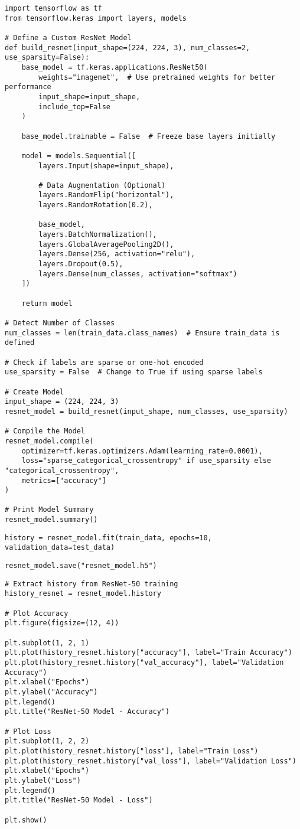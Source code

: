 \documentclass{article}
\begin{document}
\begin{lstlisting}
import tensorflow as tf
from tensorflow.keras import layers, models

# Define a Custom ResNet Model
def build_resnet(input_shape=(224, 224, 3), num_classes=2, use_sparsity=False):
    base_model = tf.keras.applications.ResNet50(
        weights="imagenet",  # Use pretrained weights for better performance
        input_shape=input_shape,
        include_top=False
    )

    base_model.trainable = False  # Freeze base layers initially

    model = models.Sequential([
        layers.Input(shape=input_shape),

        # Data Augmentation (Optional)
        layers.RandomFlip("horizontal"),
        layers.RandomRotation(0.2),

        base_model,
        layers.BatchNormalization(),
        layers.GlobalAveragePooling2D(),
        layers.Dense(256, activation="relu"),
        layers.Dropout(0.5),
        layers.Dense(num_classes, activation="softmax")
    ])

    return model

# Detect Number of Classes
num_classes = len(train_data.class_names)  # Ensure train_data is defined

# Check if labels are sparse or one-hot encoded
use_sparsity = False  # Change to True if using sparse labels

# Create Model
input_shape = (224, 224, 3)
resnet_model = build_resnet(input_shape, num_classes, use_sparsity)

# Compile the Model
resnet_model.compile(
    optimizer=tf.keras.optimizers.Adam(learning_rate=0.0001),
    loss="sparse_categorical_crossentropy" if use_sparsity else "categorical_crossentropy",
    metrics=["accuracy"]
)

# Print Model Summary
resnet_model.summary()

\end{lstlisting}
\begin{lstlisting}
history = resnet_model.fit(train_data, epochs=10, validation_data=test_data)
\end{lstlisting}
\begin{lstlisting}
resnet_model.save("resnet_model.h5")
\end{lstlisting}
\begin{lstlisting}
# Extract history from ResNet-50 training
history_resnet = resnet_model.history

# Plot Accuracy
plt.figure(figsize=(12, 4))

plt.subplot(1, 2, 1)
plt.plot(history_resnet.history["accuracy"], label="Train Accuracy")
plt.plot(history_resnet.history["val_accuracy"], label="Validation Accuracy")
plt.xlabel("Epochs")
plt.ylabel("Accuracy")
plt.legend()
plt.title("ResNet-50 Model - Accuracy")

# Plot Loss
plt.subplot(1, 2, 2)
plt.plot(history_resnet.history["loss"], label="Train Loss")
plt.plot(history_resnet.history["val_loss"], label="Validation Loss")
plt.xlabel("Epochs")
plt.ylabel("Loss")
plt.legend()
plt.title("ResNet-50 Model - Loss")

plt.show()
\end{lstlisting}
\end{document}
